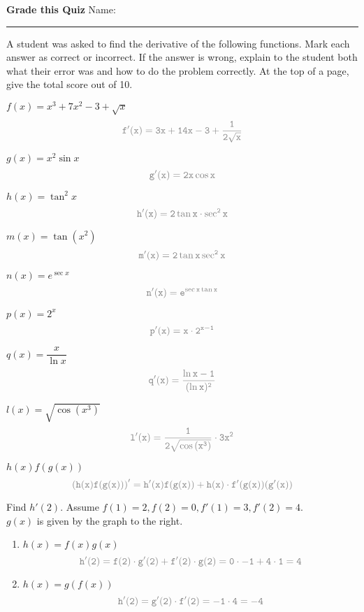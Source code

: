 \documentclass[letterpaper,11pt]{article}
\def\ds{\displaystyle}
\newcommand{\xfont}[1]{\[\textcolor{gray}{\mathtt{#1}}\]}
\begin{document}
\textbf{Grade this Quiz} \hfill Name: \rule{4cm}{0.01cm}

A student was asked to find the derivative of the following functions.  Mark each answer as correct or incorrect.  If the answer is wrong, explain to the student both what their error was and how to do the problem correctly.  At the top of a page, give the total score out of 10.

\begin{enumerate}
\item $f(x)=x^3+7x^2-3+\sqrt{x}$
\xfont{f'(x)=3x+14x-3+\frac{1}{2\sqrt{x}}}
\vfill
\item $g(x)=x^2\sin{x}$
\xfont{g'(x)=2x\cos{x}}
\vfill
\item $h(x)=\tan^2 x$
\xfont{h'(x)=2\tan{x} \cdot \sec^2 x}
\vfill
\item $m(x)=\tan{(x^2)}$
\xfont{m'(x)=2\tan{x}\sec^2 x}
\vfill
\item $n(x)=e^{\sec{x}}$
\xfont{n'(x)=e^{\sec{x}\tan{x}}}
\vfill
\newpage
\item $p(x)=2^x$
\xfont{p'(x)=x \cdot 2^{x-1}}
\vfill
\item $q(x)=\dfrac{x}{\ln{x}}$
\xfont{q'(x)=\frac{\ln{x}-1}{(\ln{x})^2}}
\vfill
\item $\ds l(x)=\sqrt{\cos{\left(x^3\right)}}$
\xfont{l'(x)=\frac{1}{2\sqrt{\cos{\left(x^3\right)}}} \cdot 3x^2}
\vfill
\item $h(x)f(g(x))$
\xfont{\left(h(x)f(g(x))\right)'=h'(x)f(g(x))+h(x) \cdot f'(g(x))(g'(x))}
\vfill
\begin{minipage}{0.65\textwidth}
\item Find $h'(2)$. Assume $f(1)=2, f(2)=0, f'(1)=3, f'(2)=4$.
\\
$g(x)$ is given by the graph to the right.
\end{minipage}
\begin{minipage}{0.25\textwidth}
\end{minipage}
\vspace{-.2in}
\begin{enumerate}
\item $h(x)=f(x)g(x)$
\xfont{h'(2)=f(2) \cdot g'(2)+f'(2) \cdot g(2) = 0\cdot-1+4\cdot1=4}
\vfill
\item $h(x)=g(f(x))$
\xfont{h'(2)=g'(2) \cdot f'(2)=-1\cdot4=-4}
\vfill
\end{enumerate}
\end{enumerate}
\end{document}
